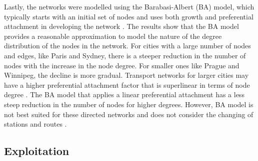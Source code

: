 \documentclass{article}
\theoremstyle{plain}
\theoremstyle{definition}
\theoremstyle{remark}
\begin{document}



Lastly, the networks were modelled using the Barabasi-Albert (BA) model, which typically starts with an initial set of nodes and uses both growth and preferential attachment in developing the network \cite{frossard_2023d}. The results show that the BA model provides a reasonable approximation to model the nature of the degree distribution of the nodes in the network. For cities with a large number of nodes and edges, like Paris and Sydney, there is a steeper reduction in the number of nodes with the increase in the node degree. For smaller ones like Prague and Winnipeg, the decline is more gradual. Transport networks for larger cities may have a higher preferential attachment factor that is superlinear in terms of node degree \cite{frossard_2023d}. The BA model that applies a linear preferential attachment has a less steep reduction in the number of nodes for higher degrees. However, BA model is not best suited for these directed networks and does not consider the changing of stations and routes \cite{Barabási_2016}.

\subsection{Exploitation}
\label{exploitation}
\end{document}
